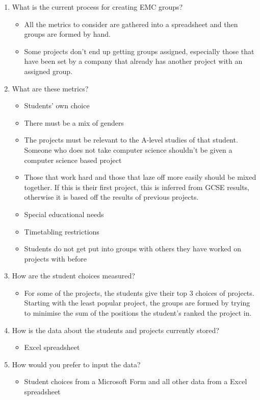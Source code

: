 \documentclass{article}
\begin{document}
\begin{enumerate}
    \item What is the current process for creating EMC groups? 
        \begin{itemize} \item All the metrics to consider are gathered into a spreadsheet and then groups are formed by hand. \item Some projects don't end up getting groups assigned, especially those that have been set by a company that already has another project with an assigned group.\end{itemize}
    \item What are these metrics?
        \begin{itemize} \item Students' own choice \item There must be a mix of genders \item The projects must be relevant to the A-level studies of that student. Someone who does not take computer science shouldn't be given a computer science based project\item Those that work hard and those that laze off more easily should be mixed together. If this is their first project, this is inferred from GCSE results, otherwise it is based off the results of previous projects. \item Special educational needs \item Timetabling restrictions \item Students do not get put into groups with others they have worked on projects with before \end{itemize}
    \item How are the student choices measured?
        \begin{itemize} \item For some of the projects, the students give their top 3 choices of projects. Starting with the least popular project, the groups are formed by trying to minimise the sum of the positions the student's ranked the project in. \end{itemize}
    \item How is the data about the students and projects currently stored?
        \begin{itemize} \item Excel spreadsheet \end{itemize}
    \item How would you prefer to input the data?
        \begin{itemize} \item Student choices from a Microsoft Form and all other data from a Excel spreadsheet \end{itemize}

\end{enumerate}
\end{document}
